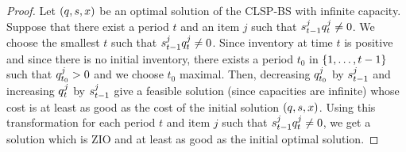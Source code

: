 \begin{proof}
Let $\bracket{\quantity,\inventory,\setup}$ be an optimal solution of the CLSP-BS with infinite capacity.
Suppose that there exist a period $t$ and an item $j$ such that $s_{t-1}^jq_t^j\ne0$.
We choose the smallest $t$ such that $s_{t-1}^jq_t^j\ne0$.
Since inventory at time $t$ is positive and since there is no initial inventory, there exists a period $t_0$ in $\range[1]{t-1}$ such that $q_{t_0}^j>0$ and we choose $t_0$ maximal.
Then, decreasing $q_{t_0}^j$ by $s_{t-1}^j$ and increasing $q_t^j$ by $s_{t-1}^j$ give a feasible solution (since capacities are infinite) whose cost is at least as good as the cost of the initial solution $\bracket{\quantity,\inventory,\setup}$.
Using this transformation for each period $t$ and item $j$ such that $s_{t-1}^jq_t^j\ne0$, we get a solution which is ZIO and at least as good as the initial optimal solution.
\end{proof}


